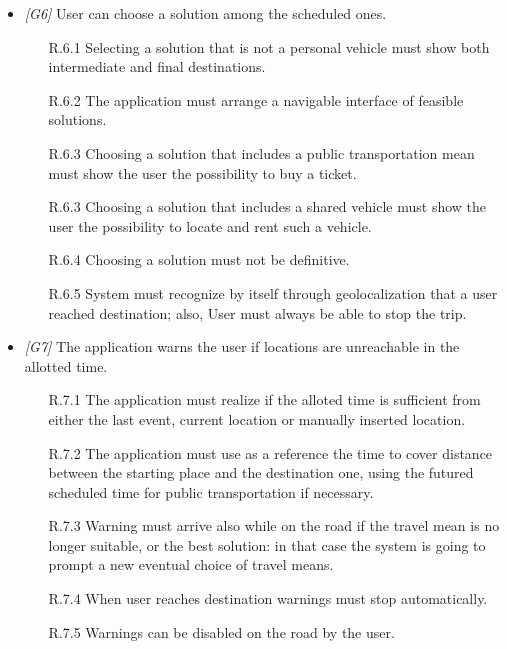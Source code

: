\begin{itemize}
                  
	\item \textit{[G6]} User can choose a solution among the scheduled ones. 
		\begin{itemize}
			\item [R.6.1] Selecting a solution that is not a personal vehicle must show both intermediate and final destinations.
			\item [R.6.2] The application must arrange a navigable interface of feasible solutions.
			\item [R.6.3] Choosing a solution that includes a public transportation mean must show the user the possibility to buy a ticket.
			\item [R.6.3] Choosing a solution that includes a shared vehicle must show the user the possibility to locate and rent such a vehicle.
			\item [R.6.4] Choosing a solution must not be definitive.
			\item [R.6.5] System must recognize by itself through geolocalization that a user reached destination; also, User must always be able to stop the trip.
		\end{itemize}
                  
                  
	\item \textit{[G7]} The application warns the user if locations are unreachable in the allotted time.
		\begin{itemize}
			\item[R.7.1] The application must realize if the alloted time is sufficient from either the last event, current location or manually inserted location.
			\item[R.7.2] The application must use as a reference the time to cover distance between the starting place and the destination one, using the futured scheduled time for public transportation if necessary.
			\item [R.7.3] Warning must arrive also while on the road if the travel mean is no longer suitable, or the best solution: in that case the system is going to prompt a new eventual choice of travel means.
			\item [R.7.4] When user reaches destination warnings must stop automatically.
			\item [R.7.5] Warnings can be disabled on the road by the user.
		\end{itemize}



\end{itemize}

